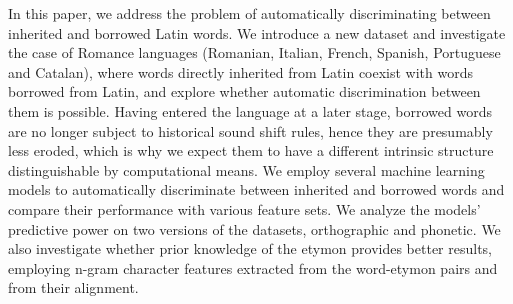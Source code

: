 In this paper, we address the problem of automatically discriminating between inherited and borrowed Latin words. We introduce a new dataset and investigate the case of Romance languages (Romanian, Italian, French, Spanish, Portuguese and Catalan), where words directly inherited from Latin coexist with words borrowed from Latin, and explore whether automatic discrimination between them is possible.  Having entered the language at a later stage, borrowed words are no longer subject to historical sound shift rules, hence they are presumably less eroded, which is why we expect them to have a different intrinsic structure distinguishable by computational means. We employ several machine learning models to automatically discriminate between inherited and borrowed words and compare their performance with various feature sets. We analyze the models' predictive power on two versions of the datasets, orthographic and phonetic. We also investigate whether prior knowledge of the etymon provides better results, employing n-gram character features extracted from the word-etymon pairs and from their alignment.
